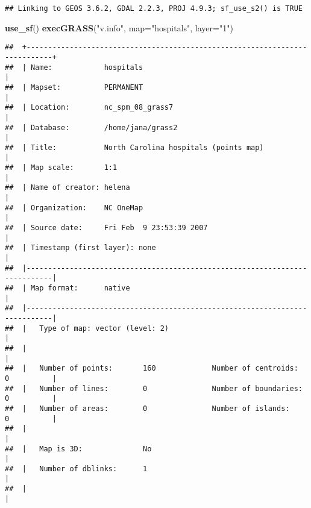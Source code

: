 \documentclass[]{article}
\newenvironment{Shaded}{\begin{snugshade}}{\end{snugshade}}
\newcommand{\KeywordTok}[1]{\textcolor[rgb]{0.13,0.29,0.53}{\textbf{#1}}}
\newcommand{\DataTypeTok}[1]{\textcolor[rgb]{0.13,0.29,0.53}{#1}}
\newcommand{\StringTok}[1]{\textcolor[rgb]{0.31,0.60,0.02}{#1}}
\newcommand{\NormalTok}[1]{#1}
\begin{document}
\begin{verbatim}
## Linking to GEOS 3.6.2, GDAL 2.2.3, PROJ 4.9.3; sf_use_s2() is TRUE
\end{verbatim}

\begin{Shaded}
\begin{Highlighting}[]
\KeywordTok{use_sf}\NormalTok{()}
\KeywordTok{execGRASS}\NormalTok{(}\StringTok{"v.info"}\NormalTok{, }\DataTypeTok{map=}\StringTok{"hospitals"}\NormalTok{, }\DataTypeTok{layer=}\StringTok{"1"}\NormalTok{)}
\end{Highlighting}
\end{Shaded}

\begin{verbatim}
##  +----------------------------------------------------------------------------+
##  | Name:            hospitals                                                 |
##  | Mapset:          PERMANENT                                                 |
##  | Location:        nc_spm_08_grass7                                          |
##  | Database:        /home/jana/grass2                                         |
##  | Title:           North Carolina hospitals (points map)                     |
##  | Map scale:       1:1                                                       |
##  | Name of creator: helena                                                    |
##  | Organization:    NC OneMap                                                 |
##  | Source date:     Fri Feb  9 23:53:39 2007                                  |
##  | Timestamp (first layer): none                                              |
##  |----------------------------------------------------------------------------|
##  | Map format:      native                                                    |
##  |----------------------------------------------------------------------------|
##  |   Type of map: vector (level: 2)                                           |
##  |                                                                            |
##  |   Number of points:       160             Number of centroids:  0          |
##  |   Number of lines:        0               Number of boundaries: 0          |
##  |   Number of areas:        0               Number of islands:    0          |
##  |                                                                            |
##  |   Map is 3D:              No                                               |
##  |   Number of dblinks:      1                                                |
##  |                                                                            |

\end{verbatim}
\end{document}
